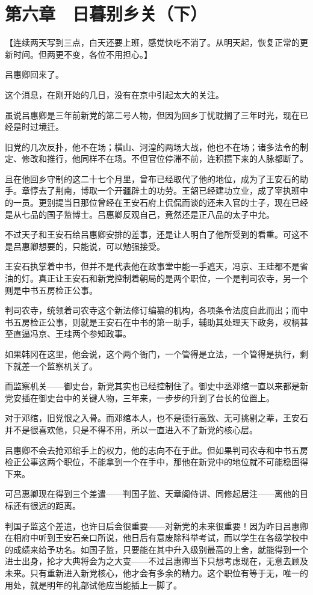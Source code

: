 \section{第六章　日暮别乡关（下） }

【连续两天写到三点，白天还要上班，感觉快吃不消了。从明天起，恢复正常的更新时间。但两更不变，各位不用担心。】

吕惠卿回来了。

这个消息，在刚开始的几日，没有在京中引起太大的关注。

虽说吕惠卿是三年前新党的第二号人物，但因为回乡丁忧耽搁了三年时光，现在已经是时过境迁。

旧党的几次反扑，他不在场；横山、河湟的两场大战，他也不在场；诸多法令的制定、修改和推行，他同样不在场。不但官位停滞不前，连积攒下来的人脉都断了。

且在他回乡守制的这二十七个月里，曾布已经取代了他的地位，成为了王安石的助手。章惇去了荆南，博取一个开疆辟土的功劳。王韶已经建功立业，成了宰执班中的一员。更别提当日那位曾经在王安石府上侃侃而谈的还未入官的士子，现在已经是从七品的国子监博士。吕惠卿反观自己，竟然还是正八品的太子中允。

不过天子和王安石给吕惠卿安排的差事，还是让人明白了他所受到的看重。可这不是吕惠卿想要的，只能说，可以勉强接受。

王安石执掌着中书，但并不是代表他在政事堂中能一手遮天，冯京、王珪都不是省油的灯。真正让王安石和新党控制着朝局的是两个职位，一个是判司农寺，另一个则是中书五房检正公事。

判司农寺，统领着司农寺这个新法修订编纂的机构，各项条令法度自此而出；而中书五房检正公事，则就是王安石在中书的第一助手，辅助其处理天下政务，权柄甚至直逼冯京、王珪两个参知政事。

如果韩冈在这里，他会说，这个两个衙门，一个管得是立法，一个管得是执行，剩下就差一个监察机关了。

而监察机关——御史台，新党其实也已经控制住了。御史中丞邓绾一直以来都是新党安插在御史台中的关键人物，三年来，一步步的升到了台长的位置上。

对于邓绾，旧党恨之入骨。而邓绾本人，也不是德行高致、无可挑剔之辈，王安石并不是很喜欢他，只是不得不用，所以一直进入不了新党的核心层。

吕惠卿不会去抢邓绾手上的权力，他的志向不在于此。但如果判司农寺和中书五房检正公事这两个职位，不能拿到一个在手中，那他在新党中的地位就不可能稳固得下来。

可吕惠卿现在得到三个差遣——判国子监、天章阁侍讲、同修起居注——离他的目标还有很远的距离。

判国子监这个差遣，也许日后会很重要——对新党的未来很重要！因为昨日吕惠卿在相府中听到王安石亲口所说，他日后有意废除科举考试，而以学生在各级学校中的成绩来给予功名。如国子监，只要能在其中升入级别最高的上舍，就能得到一个进士出身，抡才大典将会为之大变——不过吕惠卿当下只想考虑现在，无意去顾及未来。只有重新进入新党核心，他才会有多余的精力。这个职位有等于无，唯一的用处，就是明年的礼部试他应当能插上一脚了。


